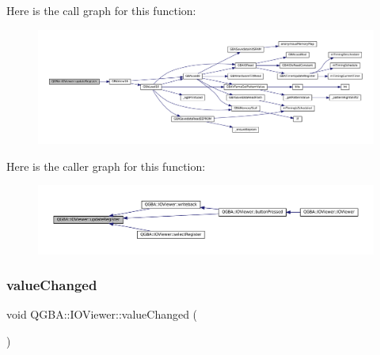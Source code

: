 Here is the call graph for this function\+:
\nopagebreak
\begin{figure}[H]
\begin{center}
\leavevmode
\includegraphics[width=350pt]{class_q_g_b_a_1_1_i_o_viewer_a2e75eb25e921d6cecdda851ea81eaf48_cgraph}
\end{center}
\end{figure}
Here is the caller graph for this function\+:
\nopagebreak
\begin{figure}[H]
\begin{center}
\leavevmode
\includegraphics[width=350pt]{class_q_g_b_a_1_1_i_o_viewer_a2e75eb25e921d6cecdda851ea81eaf48_icgraph}
\end{center}
\end{figure}
\mbox{\label{class_q_g_b_a_1_1_i_o_viewer_a42edbfb2721d0c6e79e58da52d7d9844}} 
\subsubsection{\texorpdfstring{value\+Changed}{valueChanged}}
{\footnotesize\ttfamily void Q\+G\+B\+A\+::\+I\+O\+Viewer\+::value\+Changed (\begin{DoxyParamCaption}{ }\end{DoxyParamCaption})\hspace{0.3cm}{\ttfamily [signal]}}

